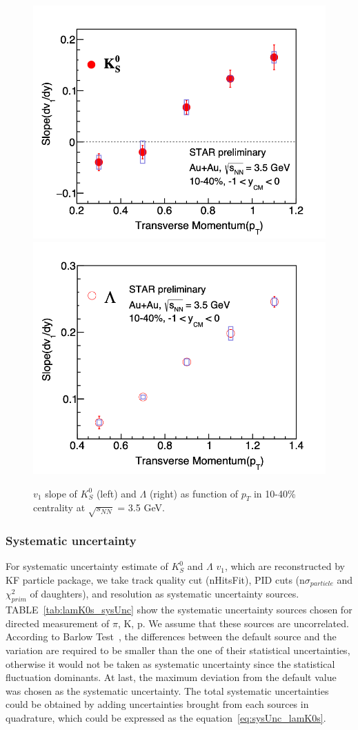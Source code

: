 \begin{figure}[hbt!]
\centering
\includegraphics[width=0.45\linewidth]{figures/chapter03/3p5gev_K0s_v1Slope_pT.png}
\includegraphics[width=0.45\linewidth]{figures/chapter03/3p5gev_Lambda_v1Slope_pT.png}
\caption{$v_1$ slope of $K^0_S$ (left) and $\Lambda$ (right) as function of $p_T$ in 10-40\% centrality at $\sqrt{s_{NN}}$ = 3.5 GeV.}
\label{fig:3p5gev_K0sLam_v1Slope_pt}
\end{figure}

\subsubsection{Systematic uncertainty}

For systematic uncertainty estimate of $K^0_S$ and $\Lambda$ $v_1$, 
which are reconstructed by KF particle package, 
we take track quality cut (nHitsFit), PID cuts (n$\sigma_{particle}$ and $\chi^2_{prim}$ of daughters), and resolution as systematic uncertainty sources.
TABLE~\ref{tab:lamK0s_sysUnc} show the systematic uncertainty sources chosen for directed measurement of $\pi$, K, p.
We assume that these sources are uncorrelated. According to Barlow Test~\cite{barlow2002systematic}, the differences between the default source and the variation are required
to be smaller than the one of their statistical uncertainties, otherwise it would not be taken as systematic uncertainty since the statistical fluctuation dominants.
At last, the maximum deviation from the default value was chosen as the systematic uncertainty. 
The total systematic uncertainties could be obtained by adding uncertainties brought from each sources in quadrature, 
which could be expressed as the equation~\ref{eq:sysUnc_lamK0s}.

